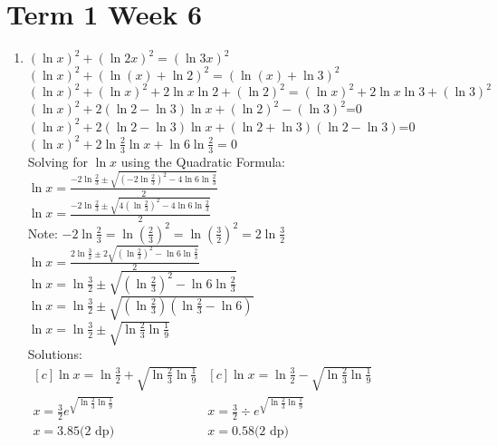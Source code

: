 \documentclass[../main.tex]{subfiles}
\begin{document}
\section*{Term 1 Week 6}
\begin{enumerate}
    \item 
    \((\ln{x})^2+(\ln{2x})^2=(\ln{3x})^2\)\\
    \((\ln{x})^2+(\ln{(x)}+\ln{2})^2=(\ln{(x)}+\ln{3})^2\)\\
    \((\ln{x})^2+(\ln{x})^2+2\ln{x}\ln{2}+(\ln{2})^2=(\ln{x})^2+2\ln{x}\ln{3}+(\ln{3})^2\)\\
    \((\ln{x})^2+2(\ln{2}-\ln{3})\ln{x}+(\ln{2})^2-(\ln{3})^2\)=0\\
    \((\ln{x})^2+2(\ln{2}-\ln{3})\ln{x}+(\ln{2}+\ln{3})(\ln{2}-\ln{3})\)=0\\
    \((\ln{x})^2+2\ln{\frac{2}{3}}\ln{x}+\ln{6}\ln{\frac{2}{3}}=0\)\\

    Solving for \(\ln{x}\) using the Quadratic Formula:\\
    \(\ln{x}=\frac{-2\ln{\frac{2}{3}}\pm \sqrt{(-2\ln{\frac{2}{3}})^2-4\ln{6}\ln{\frac{2}{3}}}}{2}\)\\

    \(\ln{x}=\frac{-2\ln{\frac{2}{3}}\pm \sqrt{4(\ln{\frac{2}{3}})^2-4\ln{6}\ln{\frac{2}{3}}}}{2}\)\\

    Note: \(-2\ln{\frac{2}{3}}=\ln{(\frac{2}{3})^2}=\ln{(\frac{3}{2})^2=2\ln{\frac{3}{2}}}\)\\

    \(\ln{x}=\frac{2\ln{\frac{3}{2}}\pm 2\sqrt{(\ln{\frac{2}{3}})^2-\ln{6}\ln{\frac{2}{3}}}}{2}\)\\

    \(\ln{x}=\ln{\frac{3}{2}}\pm \sqrt{(\ln{\frac{2}{3}})^2-\ln{6}\ln{\frac{2}{3}}}\)\\

    \(\ln{x}=\ln{\frac{3}{2}}\pm \sqrt{(\ln{\frac{2}{3}})(\ln{\frac{2}{3}}-\ln{6})}\)\\

    \(\ln{x}=\ln{\frac{3}{2}}\pm \sqrt{\ln{\frac{2}{3}}\ln{\frac{1}{9}}}\)\\

    Solutions:\\
    $
    \begin{aligned}[c]
    \ln{x}=\ln{\frac{3}{2}}+ \sqrt{\ln{\frac{2}{3}}\ln{\frac{1}{9}}}\\
    x=\frac{3}{2}e^{\sqrt{\ln{\frac{2}{3}}\ln{\frac{1}{9}}}}\\
    x=3.85 \text{(2 dp)}\\
    \end{aligned}
    \begin{aligned}[c]
    \ln{x}=\ln{\frac{3}{2}}- \sqrt{\ln{\frac{2}{3}}\ln{\frac{1}{9}}}\\
    x=\frac{3}{2}\div e^{\sqrt{\ln{\frac{2}{3}}\ln{\frac{1}{9}}}}\\
    x=0.58 \text{(2 dp)}\\
    \end{aligned}
    $
    

\end{enumerate}
\end{document}
